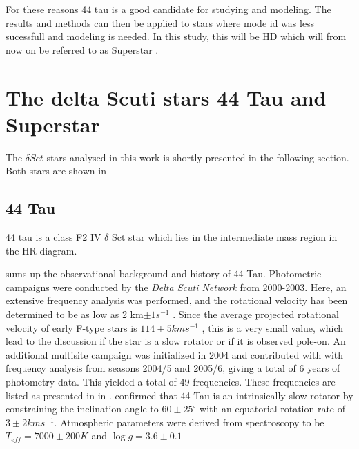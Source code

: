 For these reasons 44 tau is a good candidate for studying and modeling. The results and methods can then be applied to stars where mode id was less sucessfull and modeling is needed. In this study, this will be HD which will from now on be referred to as Superstar \citet{antoci2014role}. 

\section{The delta Scuti stars 44 Tau and Superstar}

The $\delta Sct$ stars analysed in this work is shortly presented in the following section. Both stars are shown in %
\\
 

\subsection{44 Tau}

44 tau is a class F2 IV $\delta$ Sct star which lies in the intermediate mass region in the HR diagram. 

\citet{antoci200744} sums up the observational background and history of 44 Tau. Photometric campaigns were conducted by the \textit{Delta Scuti Network} from 2000-2003. Here, an extensive frequency analysis was performed, and the rotational velocity has been determined to be as low as 2 km$ \pm 1 s^{-1}$ \citep{lenz2008asteroseismic}. Since the average projected rotational velocity of early F-type stars is $114 \pm 5 km s^{-1}$ \citep{royer2004rotational}, this is a very small value, which lead to the discussion if the star is a slow rotator or if it is observed pole-on\citep{antoci200744}. 
 An additional multisite campaign  was initialized in 2004 \citep{zima2007high} and \citet{breger2008A&A} contributed with with frequency analysis from seasons  2004/5 and 2005/6, giving a total of 6 years of photometry data. This yielded a total of 49 frequencies. These frequencies are listed as presented in \citep{lenz2010delta} in . \citet{zima2007high} confirmed that 44 Tau is an intrinsically slow rotator by constraining the inclination angle to $60 \pm 25^{\circ}$ with an equatorial rotation rate of $3 \pm 2 km s^{-1}$. Atmospheric parameters were derived from spectroscopy to be  $T_{eff} = 7000\pm200 K$ and $\log g = 3.6\pm0.1$

